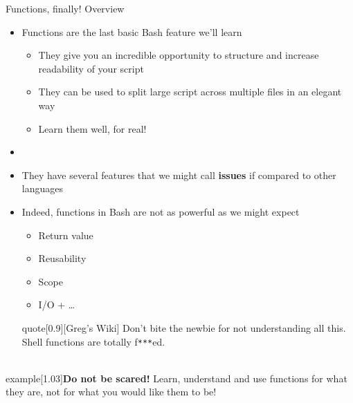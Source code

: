 
\begin{frame}{Functions, finally! Overview}
    \vspace{-4mm}
    \begin{itemize}
        \item Functions are the last basic Bash feature we'll learn
              \begin{itemize}
                  \item They give you an incredible opportunity to structure and increase readability of your script
                  \item They can be used to split large script across multiple files in an elegant way
                  \item \alert{Learn them well, for real!}
              \end{itemize}
        \item {}
        \item They have several features that we might call \textbf{issues} if compared to other languages
        \item[\PT{$\bullet$}] Indeed, functions in Bash are not as powerful as we might expect
              \begin{itemize}
                  \item[\PT{$\to$}] Return value
                  \item[\PT{$\to$}] Reusability
                  \item[\PT{$\to$}] Scope
                  \item[\PT{$\to$}] I/O + \ldots
              \end{itemize}
              \begin{varblock}{quote}[0.9\textwidth]{}[Greg's Wiki]
                  Don't bite the newbie for not understanding all this. Shell functions are totally f\texttt{***}ed. \\[-1.3ex] ~
              \end{varblock}
    \end{itemize}
    \vspace{-4mm}
    \begin{varblock}{example}[1.03\textwidth]{\textbf{Do not be scared!}}
        Learn, understand and use functions for what they are, not for what you would like them to be!
    \end{varblock}
\end{frame}
